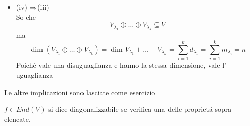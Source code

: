 \begin{prop}
\begin{itemize}
\item(iv) $\Rightarrow $(iii)\\
 So che 
$$ V_{\lambda_1} \oplus \dots \oplus V_{\lambda_k} \subseteq V $$
ma 
$$ \dim \left( V_{\lambda_1} \oplus \dots \oplus V_{\lambda_k}  \right) = \dim V_{\lambda_1} + \dots + V_{\lambda_k}=\sum_{i=1}^k d_{\lambda_1} =\sum_{i=1} ^k m_{\lambda_i} =n $$
Poich\'e vale una disuguaglianza e hanno la stessa dimensione, vale l' uguaglianza
\end{itemize}
Le altre implicazioni sono lasciate come esercizio
\endproof
\end{prop}
\spazio
\begin{defn}[Diagonalizzabile] \bianco
$f\in End(V) $ si dice diagonalizzabile se verifica una delle propriet\'a sopra elencate.
\end{defn}


\newpage
